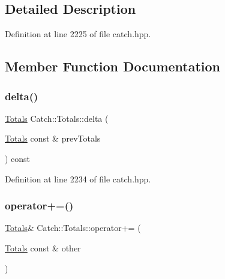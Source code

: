 \subsection{Detailed Description}


Definition at line 2225 of file catch.\+hpp.



\subsection{Member Function Documentation}
\hypertarget{struct_catch_1_1_totals_a1a94a654f5f3786b75695e081fc9bca2}{}\label{struct_catch_1_1_totals_a1a94a654f5f3786b75695e081fc9bca2} 
\subsubsection{\texorpdfstring{delta()}{delta()}}
{\footnotesize\ttfamily \hyperlink{struct_catch_1_1_totals}{Totals} Catch\+::\+Totals\+::delta (\begin{DoxyParamCaption}\item[{\hyperlink{struct_catch_1_1_totals}{Totals} const \&}]{prev\+Totals }\end{DoxyParamCaption}) const\hspace{0.3cm}{\ttfamily [inline]}}



Definition at line 2234 of file catch.\+hpp.

\hypertarget{struct_catch_1_1_totals_a574015076e54cc405c70b053e3356e43}{}\label{struct_catch_1_1_totals_a574015076e54cc405c70b053e3356e43} 
\subsubsection{\texorpdfstring{operator+=()}{operator+=()}}
{\footnotesize\ttfamily \hyperlink{struct_catch_1_1_totals}{Totals}\& Catch\+::\+Totals\+::operator+= (\begin{DoxyParamCaption}\item[{\hyperlink{struct_catch_1_1_totals}{Totals} const \&}]{other }\end{DoxyParamCaption})\hspace{0.3cm}{\ttfamily [inline]}}



